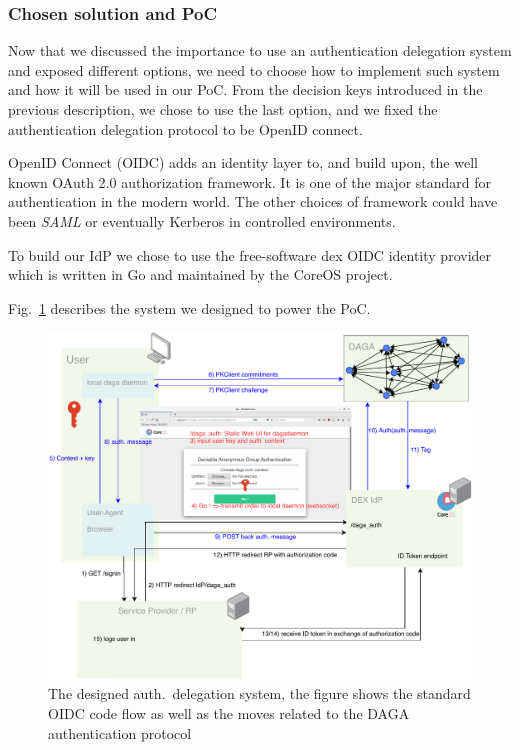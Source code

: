     \subsubsection{Chosen solution and PoC}
    Now that we discussed the importance to use an authentication delegation system and exposed different options,
    we need to choose how to implement such system and how it will be used in our PoC\@.
    From the decision keys introduced in the previous description, we chose to use the last option, and we fixed the
    authentication delegation protocol to be OpenID connect.

    OpenID Connect (OIDC) adds an identity layer to, and build upon, the well known OAuth 2.0 authorization framework.
    It is one of the major standard for authentication in the modern world.
    The other choices of framework could have been \emph{SAML} or eventually Kerberos in controlled environments.

    To build our IdP we chose to use the free-software dex OIDC identity provider which is written in Go and maintained by the CoreOS project.

    Fig.~\ref{fig:poc} describes the system we designed to power the PoC.\
    \begin{figure}
        \includegraphics[width=\linewidth]{images/poc.pdf}
        \caption{The designed auth.\ delegation system, the figure shows the standard OIDC code flow as well as the moves related to the
                    DAGA authentication protocol}
        \label{fig:poc}
    \end{figure}

